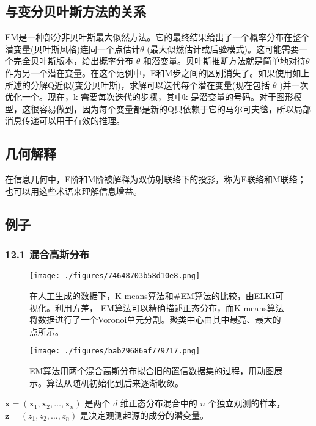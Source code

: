 \subsection{与变分贝叶斯方法的关系}

EM是一种部分非贝叶斯最大似然方法。它的最终结果给出了一个概率分布在整个潜变量(贝叶斯风格)连同一个点估计$\theta$ (最大似然估计或后验模式)。这可能需要一个完全贝叶斯版本，给出概率分布 $\theta$ 和潜变量。贝叶斯推断方法就是简单地对待$\theta$ 作为另一个潜在变量。在这个范例中，E和M步之间的区别消失了。如果使用如上所述的分解Q近似(变分贝叶斯)，求解可以迭代每个潜在变量(现在包括 $\theta$ )并一次优化一个。现在，k 需要每次迭代的步骤，其中k 是潜变量的号码。对于图形模型，这很容易做到，因为每个变量都是新的Q只依赖于它的马尔可夫毯，所以局部消息传递可以用于有效的推理。

\subsection{几何解释}

在信息几何中，E阶和M阶被解释为双仿射联络下的投影，称为E联络和M联络；也可以用这些术语来理解信息增益。

\subsection{例子}

\subsubsection{12.1 混合高斯分布}

\begin{figure}[ht]
\centering
\texttt{[image: ./figures/74648703b58d10e8.png]}
\caption{在人工生成的数据下，K-means算法和#EM算法的比较，由ELKI可视化。利用方差， EM算法可以精确描述正态分布，而K-means算法将数据进行了一个Voronoi单元分割。聚类中心由其中最亮、最大的点所示。} \label{fig_ZDQW_2}
\end{figure}

\begin{figure}[ht]
\centering
\texttt{[image: ./figures/bab29686af779717.png]}
\caption{EM算法用两个混合高斯分布拟合旧的置信数据集的过程，用动图展示。算法从随机初始化到后来逐渐收敛。} \label{fig_ZDQW_3}
\end{figure}

$\mathbf{x} = (\mathbf{x}_1, \mathbf{x}_2, \ldots, \mathbf{x}_n)$ 是两个 $d$ 维正态分布混合中的 $n$ 个独立观测的样本，$\mathbf{z} = (z_1, z_2, \ldots, z_n)$ 是决定观测起源的成分的潜变量。

